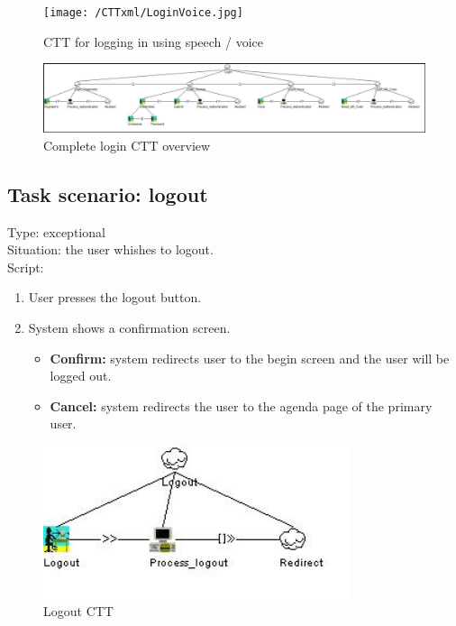 \documentclass[11pt, a4paper,svglistings]{report}
\begin{document}
\begin{figure}[H]
\centering
    \texttt{[image: /CTTxml/LoginVoice.jpg]}
  \caption[Voice login CTT]{CTT for logging in using speech / voice}
\end{figure}

\begin{figure}[H]
\centering
    \includegraphics[width=1.4\textwidth, angle=90]{LoginComplete.png}
  \caption[Login CTT]{\label{fig:Login}Complete login CTT overview}
\end{figure}


\subsection{Task scenario: logout}

Type: exceptional \\
Situation: the user whishes to logout. \\
Script:
\begin{enumerate}
\item User presses the logout button.
\item System shows a confirmation screen.
\begin{itemize}
\item \textbf{Confirm:} system redirects user to the begin screen and the user will be logged out.
\item \textbf{Cancel:} system redirects the user to the agenda page of the primary user.
\end{itemize}
\end{enumerate}

\begin{figure}[H]
\centering
    \includegraphics[width=0.8\textwidth]{Logout.jpg}
  \caption[Logout CTT]{\label{fig:Logout}Logout CTT}
\end{figure}
\end{document}
